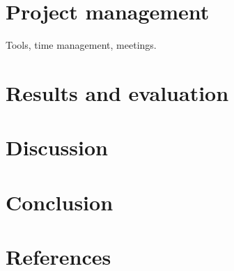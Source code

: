 \documentclass[twoside]{bhamthesis}
\begin{document}
\section{Project management}

Tools, time management, meetings.

\section{Results and evaluation}

\section{Discussion}

\section{Conclusion}

\section{References}


\declaration
\end{document}
